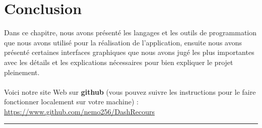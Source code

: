\documentclass[12pt]{report}
\begin{document}
\section{Conclusion}
\vspace{0.1in}

Dans ce chapitre, nous avons présenté les langages et les outils de programmation que nous avons utilisé pour la réalisation de l'application, ensuite nous avons présenté certaines interfaces graphiques que nous avons jugé les plus importantes avec les détails et les explications nécessaires pour bien expliquer le projet pleinement.
\\\\
Voici notre site Web sur \textbf{github} (vous pouvez suivre les instructions pour le faire fonctionner localement sur votre machine) : 
\\
\textcolor{blue}{\uline{\url{https://www.github.com/nemo256/DashRecours}}}

\newpage

\vspace*{-0.2in}

\begin{center}
    {\color{Blue} \rule{5.5in}{1.4mm} }\\
    \vspace{0.1in}
    \scshape{\fontsize{34}{46}{\bfseries{\color{Blue}{Conclusion générale}}}}
    \\
    \vspace{0.5in}
\end{center}
\end{document}
